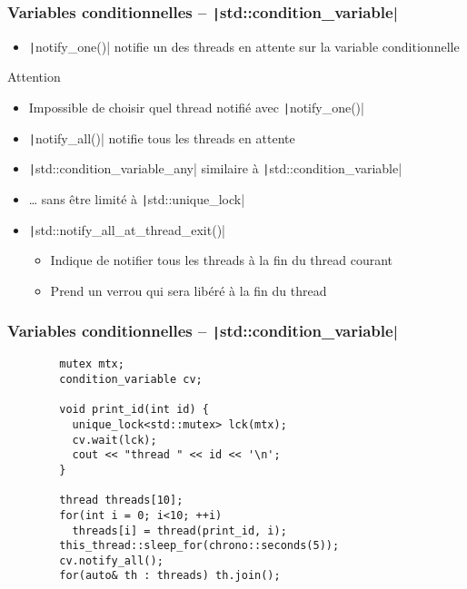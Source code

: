 \documentclass[C++.tex]{subfiles}
\begin{document}
\begin{frame}[fragile]
	\frametitle{Variables conditionnelles -- \texttt|std::condition_variable|}
	\begin{itemize}
		\item \texttt|notify_one()| notifie un des threads en attente sur la variable conditionnelle
	\end{itemize}

	\begin{alertblock}{Attention}
		\begin{itemize}
			\item Impossible de choisir quel thread notifié avec \texttt|notify_one()|
	\end{itemize}
	\end{alertblock}

	\begin{itemize}
		\item \texttt|notify_all()| notifie tous les threads en attente
		\item \texttt|std::condition_variable_any| similaire à \texttt|std::condition_variable|
		\item \ldots{} sans être limité à \texttt|std::unique_lock|
		\item \texttt|std::notify_all_at_thread_exit()| 
		\begin{itemize}
			\item Indique de notifier tous les threads à la fin du thread courant
			\item Prend un verrou qui sera libéré à la fin du thread
		\end{itemize}
	\end{itemize}
\end{frame}

\begin{frame}[fragile]
	\frametitle{Variables conditionnelles -- \texttt|std::condition_variable|}
	\begin{verbatim}
		mutex mtx;
		condition_variable cv;

		void print_id(int id) {
		  unique_lock<std::mutex> lck(mtx);
		  cv.wait(lck);
		  cout << "thread " << id << '\n';
		}

		thread threads[10];
		for(int i = 0; i<10; ++i)
		  threads[i] = thread(print_id, i);
		this_thread::sleep_for(chrono::seconds(5));
		cv.notify_all();
		for(auto& th : threads) th.join();
	\end{verbatim}
\end{frame}
\end{document}
